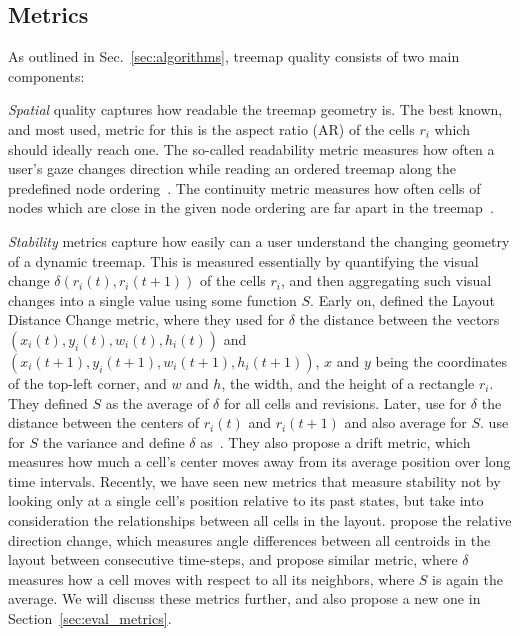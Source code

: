 \subsection{Metrics}
\label{sec:metrics-3}
%
As outlined in Sec.~\ref{sec:algorithms}, treemap quality consists of two main components:

\emph{Spatial} quality captures how readable the treemap geometry is. The best known, and most used, metric for this is the aspect ratio (AR) of the cells $r_i$ which should ideally reach one. The so-called readability metric measures how often a user's gaze changes direction while reading an ordered treemap along the predefined node ordering~\citep{bederson02}. The continuity metric measures how often cells of nodes which are close in the given node ordering are far apart in the treemap~\citep{spiral}. %

\noindent\emph{Stability} metrics capture how easily can a user understand the changing geometry of a dynamic treemap. This is measured essentially by quantifying the visual change $\delta(r_i(t), r_i(t+1))$ of the cells $r_i$, and then aggregating such visual changes into a single value using some function $S$. Early on, \cite{ordered} defined the Layout Distance Change metric, where they used for $\delta$ the distance between the vectors $(x_i(t), y_i(t), w_i(t), h_i(t))$ and $(x_i(t+1), y_i(t+1), w_i(t+1), h_i(t+1))$, $x$ and $y$ being the coordinates of the top-left corner, and $w$ and $h$, the width, and the height of a rectangle $r_i$. They defined $S$ as the average of $\delta$ for all cells and revisions. Later, \cite{hahn10} use for $\delta$ the distance between the centers of $r_i(t)$ and $r_i(t+1)$ and also average for $S$. \cite{hilbert_moore} use for $S$ the variance and define $\delta$ as~\citep{ordered}. They also propose a drift metric, which measures how much a cell's center moves away from its average position over long time intervals. Recently, we have seen new metrics that measure stability not by looking only at a single cell's position relative to its past states, but take into consideration the relationships between all cells in the layout. \cite{Hahn2017} propose the relative direction change, which measures angle differences between all centroids in the layout between consecutive time-steps, and \cite{sondag17} propose similar metric, where $\delta$ measures how a cell moves with respect to all its neighbors, where $S$ is again the average.
We will discuss these metrics further, and also propose a new one in Section~\ref{sec:eval_metrics}.

